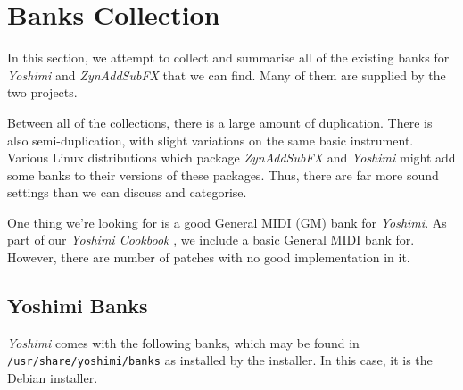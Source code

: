 %
%
%

\section{Banks Collection}
\label{sec:banks_collection}

   In this section, we attempt to collect and summarise all of the existing
   banks for \textsl{Yoshimi} and \textsl{ZynAddSubFX}
   that we can find.  Many of them
   are supplied by the two projects.

   Between all of the collections, there is a large amount of duplication.
   There is also semi-duplication, with slight variations on the same basic
   instrument.
   Various Linux distributions which package \textsl{ZynAddSubFX}
   and \textsl{Yoshimi}
   might add some banks to their versions of these packages.
   Thus, there are far more sound settings than we can discuss and categorise.

   One thing we're looking for is a good General MIDI (GM) bank for
   \textsl{Yoshimi}.  As part of our \textsl{Yoshimi Cookbook}
   \cite{cookbook}, we include a basic General MIDI bank for.
   However, there are number of patches with no good implementation in it.

\subsection{Yoshimi Banks}
\label{subsec:banks_collection_yoshimi}

   \textsl{Yoshimi} comes with the following banks, which may be found in
   \texttt{/usr/share/yoshimi/banks} as installed by the installer.  In this
   case, it is the Debian installer.

